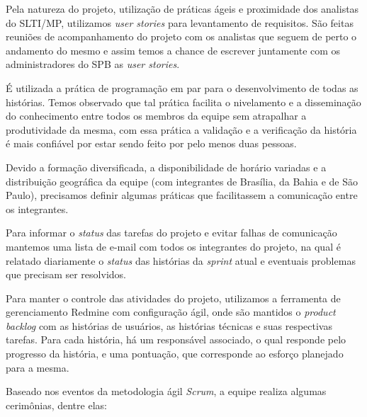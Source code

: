 Pela natureza do projeto, utilização de práticas ágeis e proximidade dos analistas do SLTI/MP, utilizamos {\it user stories} para levantamento de requisitos. São feitas reuniões de acompanhamento do projeto com os analistas que seguem de perto o andamento 
do mesmo e assim temos a chance de escrever juntamente com os administradores 
do SPB as {\it user stories}. 

É utilizada a prática de programação em par para o desenvolvimento de todas as 
histórias. Temos observado que tal prática facilita o nivelamento e a disseminação 
do conhecimento entre todos os membros da equipe sem atrapalhar a produtividade 
da mesma, com essa prática a validação e a verificação da história é mais 
confiável por estar sendo feito por pelo menos duas pessoas.


Devido a formação diversificada, a disponibilidade de horário variadas e a distribuição geográfica da equipe (com integrantes de Brasília, da Bahia e de São Paulo), precisamos definir algumas práticas que facilitassem a comunicação entre os integrantes. 

Para informar o \textit{status} das tarefas do projeto e evitar falhas de comunicação mantemos uma lista de e-mail com todos os integrantes do projeto, na qual é relatado diariamente o \textit{status} das histórias da \textit{sprint} atual e eventuais problemas que precisam ser resolvidos. 

Para manter o controle das atividades do projeto, utilizamos a ferramenta de gerenciamento Redmine com configuração ágil, onde são mantidos o \textit{product backlog} com as histórias de usuários, as histórias técnicas e suas respectivas tarefas. Para cada história, há um responsável associado, o qual responde pelo progresso da história, e uma pontuação, que corresponde ao esforço planejado para a mesma.


Baseado nos eventos da metodologia ágil \textit{Scrum}, a equipe realiza algumas cerimônias, dentre elas:

